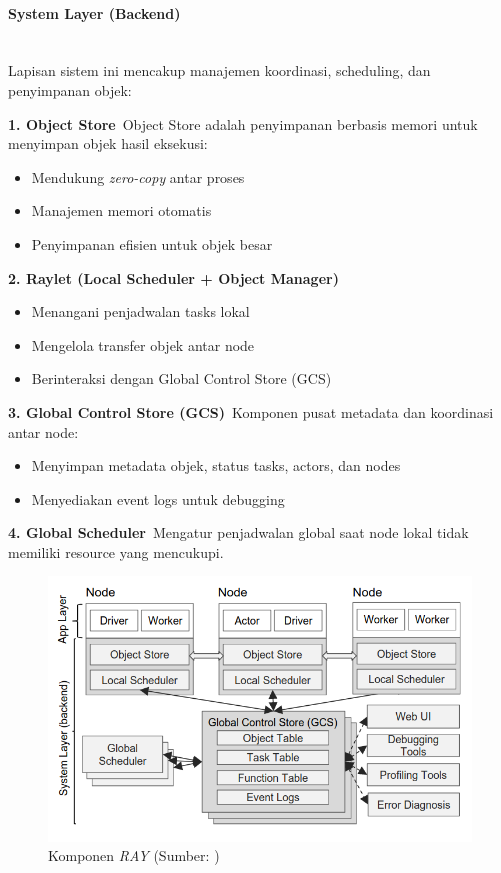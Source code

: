 \paragraph{System Layer (Backend)}\mbox{}\\
Lapisan sistem ini mencakup manajemen koordinasi, scheduling, dan penyimpanan objek:

\textbf{1. Object Store}\
Object Store adalah penyimpanan berbasis memori untuk menyimpan objek hasil eksekusi:
\begin{itemize}
\item Mendukung \textit{zero-copy} antar proses
\item Manajemen memori otomatis
\item Penyimpanan efisien untuk objek besar
\end{itemize}

\textbf{2. Raylet (Local Scheduler + Object Manager)}\
\begin{itemize}
\item Menangani penjadwalan tasks lokal
\item Mengelola transfer objek antar node
\item Berinteraksi dengan Global Control Store (GCS)
\end{itemize}

\textbf{3. Global Control Store (GCS)}\
Komponen pusat metadata dan koordinasi antar node:
\begin{itemize}
\item Menyimpan metadata objek, status tasks, actors, dan nodes
\item Menyediakan event logs untuk debugging
\end{itemize}

\textbf{4. Global Scheduler}\
Mengatur penjadwalan global saat node lokal tidak memiliki resource yang mencukupi.

\begin{figure} [H] \centering
  \includegraphics[scale=0.5]{gambar/arsitektur-ray.png}
  \caption{Komponen \emph{RAY} (Sumber: \cite{moritz2018ray})}
  \label{fig:Arsitekur RAY}
\end{figure}

